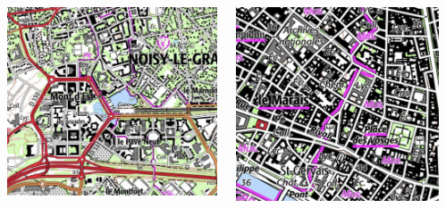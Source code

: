 \documentclass[english,11pt]{beamer}
\begin{document}
{\begin{columns}
\begin{column}{0.31\textwidth}
	\end{column}
	\vrule{}
	\begin{column}{0.33\textwidth}
	
		\includegraphics[width=\textwidth]{figuresslides/morpho_montdest.png}
		
	\end{column}
	\vrule{}
	\begin{column}{0.31\textwidth}
		
		\includegraphics[width=\textwidth]{figuresslides/morpho_marais.png}
	
	\end{column}
\end{columns}
}
\end{document}
